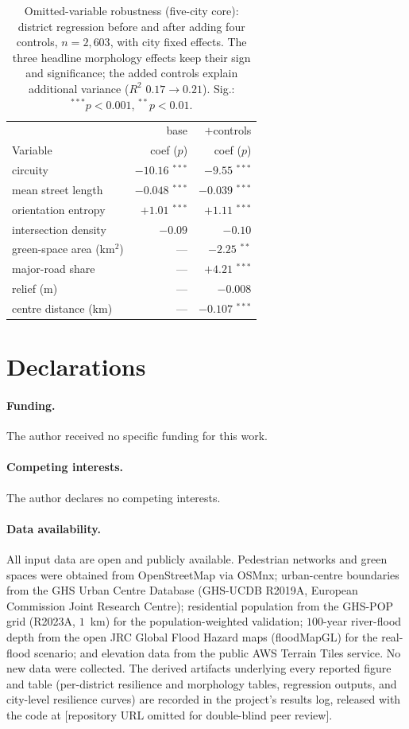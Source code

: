 \begin{table}[t]\centering
\caption{Omitted-variable robustness (five-city core): district regression before and
after adding four controls, $n=2{,}603$, with city fixed effects. The three headline
morphology effects keep their sign and significance; the added controls explain
additional variance ($R^2$ $0.17\to0.21$). Sig.: $^{***}p<0.001$, $^{**}p<0.01$.}
\label{tab:controls}
\begin{tabular}{lrr}
\toprule
& base & $+$controls\\
Variable & coef ($p$) & coef ($p$)\\
\midrule
circuity & $-10.16$ $^{***}$ & $-9.55$ $^{***}$\\
mean street length & $-0.048$ $^{***}$ & $-0.039$ $^{***}$\\
orientation entropy & $+1.01$ $^{***}$ & $+1.11$ $^{***}$\\
intersection density & $-0.09$ & $-0.10$\\
\midrule
green-space area (km$^2$) & --- & $-2.25$ $^{**}$\\
major-road share & --- & $+4.21$ $^{***}$\\
relief (m) & --- & $-0.008$\\
centre distance (km) & --- & $-0.107$ $^{***}$\\
\bottomrule
\end{tabular}
\end{table}


\section*{Declarations}

\paragraph{Funding.} The author received no specific funding for this work.

\paragraph{Competing interests.} The author declares no competing interests.

\paragraph{Data availability.} All input data are open and publicly available.
Pedestrian networks and green spaces were obtained from OpenStreetMap via
OSMnx; urban-centre boundaries from the GHS Urban Centre Database (GHS-UCDB
R2019A, European Commission Joint Research Centre); residential population from the
GHS-POP grid (R2023A, $1$~km) for the population-weighted validation; $100$-year
river-flood depth from the open JRC Global Flood Hazard maps (floodMapGL) for the
real-flood scenario; and elevation data from the public AWS Terrain Tiles service. No new data were collected. The derived
artifacts underlying every reported figure and table (per-district resilience and
morphology tables, regression outputs, and city-level resilience curves) are
recorded in the project's results log, released with the code at
[repository URL omitted for double-blind peer review].

